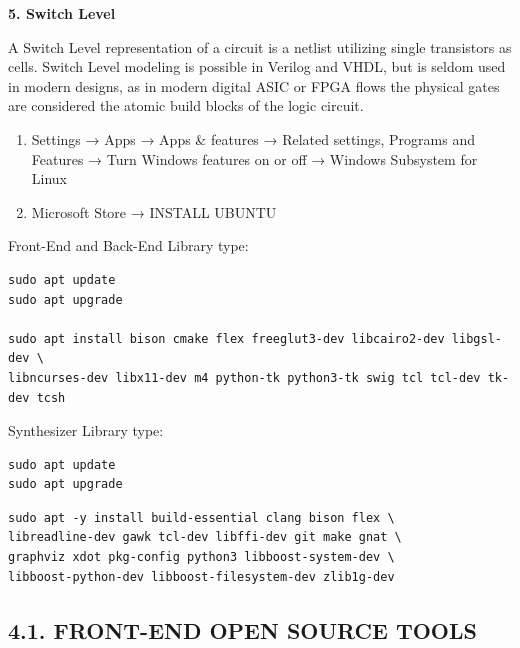 \documentclass[
]{article}
\begin{document}
\textbf{5. Switch Level}

A Switch Level representation of a circuit is a netlist utilizing single
transistors as cells. Switch Level modeling is possible in Verilog and
VHDL, but is seldom used in modern designs, as in modern digital ASIC or
FPGA flows the physical gates are considered the atomic build blocks of
the logic circuit.

\begin{enumerate}
\def\labelenumi{\arabic{enumi}.}
\item
  Settings → Apps → Apps \& features → Related settings, Programs and
  Features → Turn Windows features on or off → Windows Subsystem for
  Linux
\item
  Microsoft Store → INSTALL UBUNTU
\end{enumerate}

Front-End and Back-End Library type:

\begin{verbatim}
sudo apt update
sudo apt upgrade

sudo apt install bison cmake flex freeglut3-dev libcairo2-dev libgsl-dev \
libncurses-dev libx11-dev m4 python-tk python3-tk swig tcl tcl-dev tk-dev tcsh
\end{verbatim}

Synthesizer Library type:

\begin{verbatim}
sudo apt update
sudo apt upgrade
\end{verbatim}

\begin{verbatim}
sudo apt -y install build-essential clang bison flex \
libreadline-dev gawk tcl-dev libffi-dev git make gnat \
graphviz xdot pkg-config python3 libboost-system-dev \
libboost-python-dev libboost-filesystem-dev zlib1g-dev
\end{verbatim}

\hypertarget{front-end-open-source-tools}{%
\subsection{4.1. FRONT-END OPEN SOURCE
TOOLS}\label{front-end-open-source-tools}}
\end{document}
